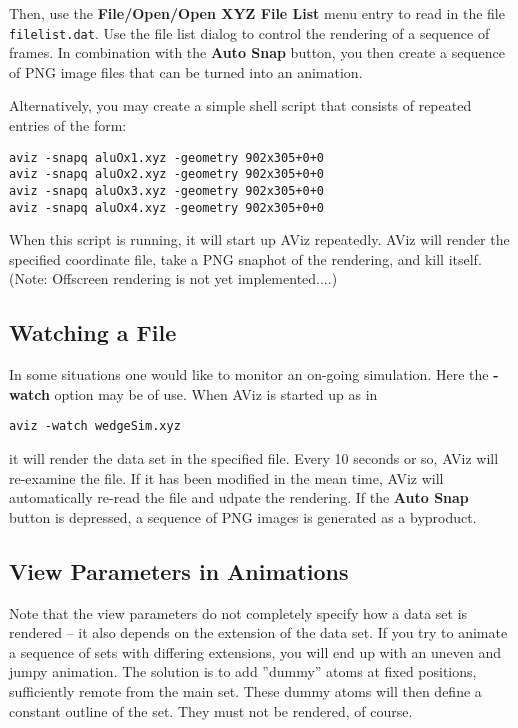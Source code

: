 \documentclass[11pt]{article}
\begin{document}
Then, use the {\bf File/Open/Open XYZ File List} menu entry to read in the file
{\tt filelist.dat}.  Use the file list dialog to control the rendering of a
sequence of frames.  In combination with the {\bf Auto Snap} button, you then
create a sequence of PNG image files that can be turned into an animation. 

Alternatively, you may create a simple shell script that consists of repeated
entries of the form:
\begin{verbatim}
aviz -snapq aluOx1.xyz -geometry 902x305+0+0
aviz -snapq aluOx2.xyz -geometry 902x305+0+0
aviz -snapq aluOx3.xyz -geometry 902x305+0+0
aviz -snapq aluOx4.xyz -geometry 902x305+0+0
\end{verbatim}

When this script is running, it will start up AViz repeatedly.  AViz 
will render the specified coordinate file, take a PNG snaphot of the 
rendering, and kill itself.  (Note: Offscreen rendering is not yet 
implemented....)

\subsection{Watching a File}
\label{watching}
In some situations one would like to monitor an on-going simulation.  Here
the {\bf -watch} option may be of use.  When AViz is started up as in 

\begin{verbatim}
aviz -watch wedgeSim.xyz 
\end{verbatim}

it will render the data set in the specified file.  Every 10 seconds or so, 
AViz will re-examine the file.  If it has been modified in the mean time, 
AViz will automatically re-read the file and udpate the rendering.  If 
the {\bf Auto Snap} button is depressed, a sequence of PNG images is generated
as a byproduct.

\subsection{View Parameters in Animations}
\label{viewParamAnimation}
Note that the view parameters do not completely specify how a data set is 
rendered -- it also depends on the extension of the data set.  If you try 
to animate a sequence of sets with differing extensions, you will end up 
with an uneven and jumpy animation.  The solution is to add ''dummy'' atoms
at fixed positions, sufficiently remote from the main set.  These dummy 
atoms will then define a constant outline of the set.  They must not be 
rendered, of course.  
\end{document}
